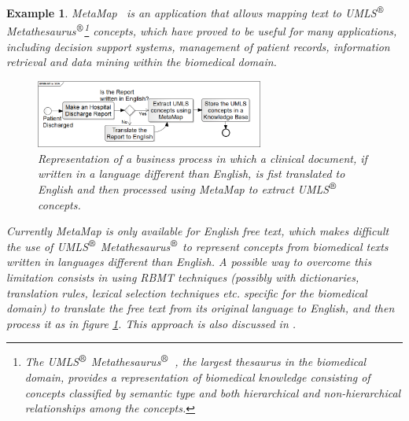 \documentclass[11pt]{article}
\newtheorem{ex}[theo]{Example}
\begin{document}
\begin{ex}
MetaMap~\citep{metamap} is an application that allows mapping text to UMLS$^{\mbox{\small\textregistered}}$ 
Metathesaurus$^{\mbox{\small\textregistered}}$\footnote{The UMLS$^{\mbox{\small\textregistered}}$ Metathesaurus$^{\mbox{\small\textregistered}}$~\citep{umls}, 
the largest thesaurus in the biomedical domain, provides a representation of biomedical knowledge consisting of concepts classified by semantic 
type and both hierarchical and non-hierarchical relationships among the concepts.} concepts, which have proved to be useful for many applications, 
including decision support systems, management of patient records, information retrieval and data mining within the biomedical domain.

\begin{figure}[!ht]
\begin{center}
\includegraphics[width=7.5cm]{mtsoa}
\end{center}
\caption{Representation of a business process in which a clinical document, if written in a language different than English, is fist translated
  to English and then processed using MetaMap to extract UMLS$^{\mbox{\small\textregistered}}$ concepts.}
\label{fig:mtsoa}
\end{figure}

Currently MetaMap is only available for English free text, which makes difficult the use of UMLS$^{\mbox{\small\textregistered}}$ 
Metathesaurus$^{\mbox{\small\textregistered}}$ to represent concepts from biomedical texts written in languages different than English.
A possible way to overcome this limitation consists in using RBMT techniques (possibly with dictionaries, translation rules, 
lexical selection techniques etc. specific for the biomedical domain) to translate the free text from its original language 
to English, and then process it as in figure \ref{fig:mtsoa}. This approach is also discussed in .
\end{ex}
\end{document}
